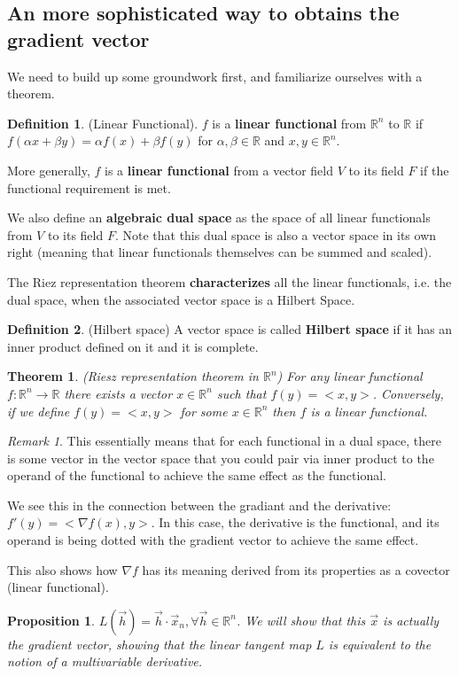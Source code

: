 \documentclass[12pt]{article}
\newcommand{\R}{\mathbb{R}}
\newtheorem{theorem}{Theorem}[section]
\newtheorem{proposition}{Proposition}[theorem]
\theoremstyle{definition}
\newtheorem{definition}{Definition}[section]
\theoremstyle{remark}
\newtheorem*{remark}{Remark}
\begin{document}
\subsection{An more sophisticated way to obtains the gradient vector}
We need to build up some groundwork first, and familiarize ourselves with a theorem.
\begin{definition}
    (Linear Functional). $f$ is a \textbf{linear functional} from $\R^n$ to $\R$ if $f(\alpha x+\beta y)=\alpha f(x) + \beta f(y)$ for $\alpha, \beta\in \R$ and $x,y\in\R^n$.

    More generally, $f$ is a \textbf{linear functional} from a vector field $V$ to its field $F$ if the functional requirement is met.

    We also define an \textbf{algebraic dual space} as the space of all linear functionals from $V$ to its field $F$. Note that this dual space is also a vector space in its own right (meaning that linear functionals themselves can be summed and scaled).
\end{definition}
The Riez representation theorem \textbf{characterizes} all the linear functionals, i.e. the dual space, when the associated vector space is a Hilbert Space.
\begin{definition}
    (Hilbert space) A vector space is called \textbf{Hilbert space} if it has an inner product defined on it and it is complete.
\end{definition}
\begin{theorem}
    (Riesz representation theorem in $\R^n$) For any linear functional $f:\R^n\to\R$ there exists a vector $x\in\R^n$ such that $f(y)= <x,y>$.
    Conversely, if we define $f(y)= <x,y>$ for some $x\in\R^n$ then $f$ is a linear functional.
\end{theorem}
\begin{remark}
    This essentially means that for each functional in a dual space, there is some vector in the vector space that you could pair via inner product to the operand of the functional to achieve the same effect as the functional.

    We see this in the connection between the gradiant and the derivative: $f'(y)= <\nabla f(x),y>$. In this case, the derivative is the functional, and its operand is being dotted with the gradient vector to achieve the same effect.

    This also shows how $\nabla f$ has its meaning derived from its properties as a covector (linear functional).
\end{remark}
\begin{proposition}
    $L(\vec{h})=\vec{h}\cdot \vec{x}_n, \forall \vec{h} \in \R^n$. We will show that this $\vec{x}$ is actually the gradient vector, showing that the linear tangent map $L$ is equivalent to the notion of a multivariable derivative.
\end{proposition}
\end{document}
